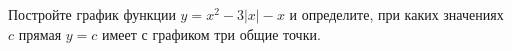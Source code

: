 \begin{ex}[type=none]
	Постройте график функции $y=x^2-3|x|-x$ и определите, при каких значениях $c$ прямая $y=c$ имеет с графиком три общие точки.
\end{ex}
